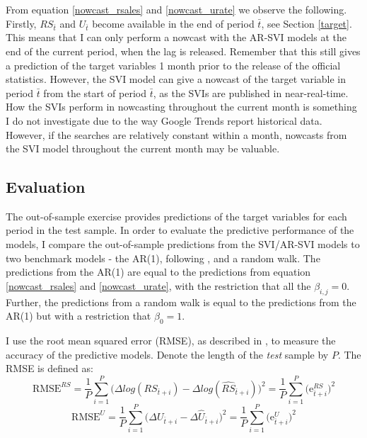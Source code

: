 \noindent From equation \eqref{nowcast_rsales} and \eqref{nowcast_urate} we observe the following. Firstly, $RS_{\bar{t}}$ and $U_{\bar{t}}$ become available in the end of period $\bar{t}$, see Section \ref{target}. This means that I can only perform a nowcast with the AR-SVI models at the end of the current period, when the lag is released. Remember that this still gives a prediction of the target variables 1 month prior to the release of the official statistics. However, the SVI model can give a nowcast of the target variable in period $\bar{t}$ from the start of period $\bar{t}$, as the SVIs are published in near-real-time. How the SVIs perform in nowcasting throughout the current month is something I do not investigate due to the way Google Trends report historical data. However, if the searches are relatively constant within a month, nowcasts from the SVI model throughout the current month may be valuable.



\subsection{Evaluation}\label{evaluation}

The out-of-sample exercise provides predictions of the target variables for each period in the test sample. In order to evaluate the predictive performance of the models, I  compare the out-of-sample predictions from the SVI/AR-SVI models to two benchmark models - the AR(1), following \textcite{choi2012}, and a random walk. The predictions from the AR(1) are equal to the predictions from equation \eqref{nowcast_rsales} and \eqref{nowcast_urate}, with the restriction that all the $\beta_{i,j} = 0$. Further, the predictions from a random walk is equal to the predictions from the AR(1) but with a restriction that $\beta_0 = 1$.

I use the root mean squared error (RMSE), as described in \textcite{bjornland2015}, to measure the accuracy of the predictive models. Denote the length of the \textit{test} sample by $P$. The RMSE is defined as:
\begin{equation}\label{rmse_rsales}
	\text{RMSE}^{RS} = \frac{1}{P} \sum_{i = 1}^{P} \Big(\Delta log(RS_{\bar{t} + i}) - \Delta log(\hat{RS}_{\bar{t} + i})\Big)^2 = \frac{1}{P} \sum_{i = 1}^{P} \Big(\mathrm{e}_{\bar{t} + i}^{RS}\Big)^2
\end{equation}
\begin{equation}\label{rmse_urate}
	\text{RMSE}^{U} = \frac{1}{P} \sum_{i = 1}^{P} \Big(\Delta U_{\bar{t} + i} - \Delta \hat{U}_{\bar{t} + i}\Big)^2 = \frac{1}{P} \sum_{i = 1}^{P} \Big(\mathrm{e}_{\bar{t} + i}^U\Big)^2
\end{equation}

